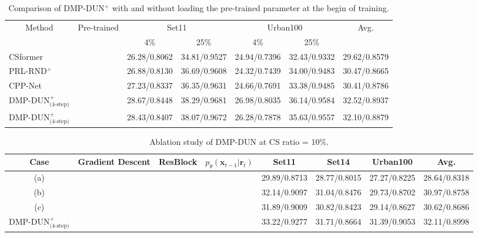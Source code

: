 \documentclass[10pt,twocolumn,letterpaper]{article}
\begin{document}
\begin{table}[t]
	\begin{adjustbox}{width=0.75\linewidth,center}
		\begin{tabular}{@{}lcccccc@{}}
			\toprule
			\multicolumn{1}{c}{\multirow{2}{*}{Method}} & \multirow{2}{*}{Pre-trained} & \multicolumn{2}{c}{Set11} & \multicolumn{2}{c}{Urban100} & \multirow{2}{*}{Avg.} \\ \cmidrule(lr){3-4}\cmidrule(lr){5-6}
			\multicolumn{1}{c}{} &  & 4\% & 25\% & 4\% & 25\% &  \\ \midrule
			CSformer\cite{ye2021csformer} & \XSolidBrush & 26.28/0.8062 & 34.81/0.9527 & 24.94/0.7396 & 32.43/0.9332 & 29.62/0.8579 \\
			PRL-RND$^+$\cite{DBLP:journals/ijcv/ChenSXZ23} & \XSolidBrush & 26.88/0.8130 & 36.69/0.9608 & 24.32/0.7439 & 34.00/0.9483 & 30.47/0.8665 \\
			CPP-Net\cite{guoCPPNet2024} & \XSolidBrush & 27.23/0.8337 & 36.35/0.9631 & 24.66/0.7691 & 33.38/0.9485 & 30.41/0.8786 \\ \midrule
			DMP-DUN$^+_\text{(4-step)}$ & \Checkmark & 28.67/0.8448 & 38.29/0.9681 & 26.98/0.8035 & 36.14/0.9584 & 32.52/0.8937 \\
			DMP-DUN$^+_\text{(4-step)}$ & \XSolidBrush & 28.43/0.8407 & 38.07/0.9672 & 26.28/0.7878 & 35.63/0.9557 & 32.10/0.8879 \\ \bottomrule
		\end{tabular}
	\end{adjustbox}
	\caption{Comparison of DMP-DUN$^+$ with and without loading the pre-trained parameter at the begin of training.}
	\label{table:pretrained_ex}
\end{table}



\begin{table}[t]
	\centering
	
	\begin{adjustbox}{width=0.85\linewidth,center}
		\begin{tabular}{@{}cccccccc@{}}
			\toprule
			\multicolumn{1}{c}{Case} & Gradient Descent & ResBlock & $p_\theta (\mathbf{x}_{t-1}|\mathbf{r}_t)$ & Set11 & Set14 & Urban100 & Avg. \\ \midrule
			(a) & \XSolidBrush & \Checkmark & \Checkmark & 29.89/0.8713 & 28.77/0.8015 & 27.27/0.8225 & 28.64/0.8318 \\
			(b) & \Checkmark & \XSolidBrush & \Checkmark & 32.14/0.9097 & 31.04/0.8476 & 29.73/0.8702 & 30.97/0.8758 \\
			(c) & \Checkmark & \Checkmark & \XSolidBrush & 31.89/0.9009 & 30.82/0.8423 & 29.14/0.8627 & 30.62/0.8686 \\
			\rowcolor[HTML]{EFEFEF} 
			DMP-DUN$^+_\text{(4-step)}$ & \Checkmark & \Checkmark & \Checkmark & 33.22/0.9277 & 31.71/0.8664 & 31.39/0.9053 & 32.11/0.8998 \\ \bottomrule
		\end{tabular}
	\end{adjustbox}
	\caption{Ablation study of DMP-DUN at CS ratio = 10\%.}
	\label{table:abl_ex}
\end{table}
\end{document}
